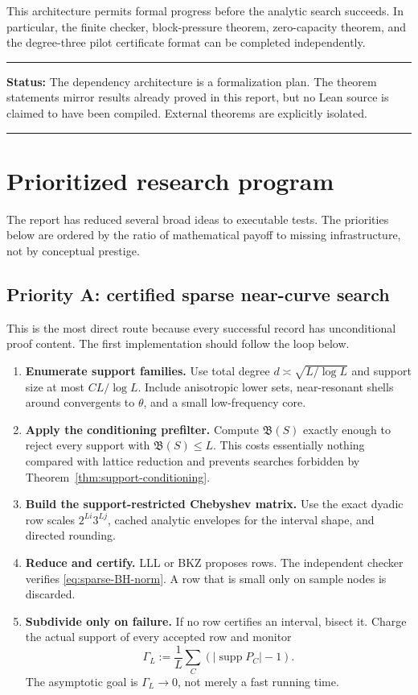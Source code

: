 \documentclass[11pt,oneside]{article}
\theoremstyle{definition}
\theoremstyle{remark}
\newcommand{\supp}{\operatorname{supp}}
\newcommand{\tht}{\theta}
\newenvironment{statusbox}[1]
{\begin{center}\begin{minipage}{0.95\textwidth}\raggedright\hrule
\vspace{0.45em}\textbf{Status:} #1\par\vspace{0.35em}}
{\vspace{0.35em}\hrule\end{minipage}\end{center}}
\begin{document}
This architecture permits formal progress before the analytic search succeeds.  In particular,
the finite checker, block-pressure theorem, zero-capacity theorem, and the degree-three pilot
certificate format can be completed independently.

\begin{statusbox}{The dependency architecture is a formalization plan.  The theorem statements
mirror results already proved in this report, but no Lean source is claimed to have been compiled.
External theorems are explicitly isolated.}
\end{statusbox}

\section{Prioritized research program}
\label{sec:program}

The report has reduced several broad ideas to executable tests.  The priorities below are ordered
by the ratio of mathematical payoff to missing infrastructure, not by conceptual prestige.

\subsection{Priority A: certified sparse near-curve search}

This is the most direct route because every successful record has unconditional proof content.
The first implementation should follow the loop below.

\begin{enumerate}
\item \textbf{Enumerate support families.}  Use total degree
$d\asymp\sqrt{L/\log L}$ and support size at most $CL/\log L$.  Include anisotropic lower sets,
near-resonant shells around convergents to $\tht$, and a small low-frequency core.
\item \textbf{Apply the conditioning prefilter.}  Compute $\mathfrak B(S)$ exactly enough to
reject every support with $\mathfrak B(S)\le L$.  This costs essentially nothing compared with
lattice reduction and prevents searches forbidden by Theorem~\ref{thm:support-conditioning}.
\item \textbf{Build the support-restricted Chebyshev matrix.}  Use the exact dyadic row scales
$2^{Li}3^{Lj}$, cached analytic envelopes for the interval shape, and directed rounding.
\item \textbf{Reduce and certify.}  LLL or BKZ proposes rows.  The independent checker verifies
\eqref{eq:sparse-BH-norm}.  A row that is small only on sample nodes is discarded.
\item \textbf{Subdivide only on failure.}  If no row certifies an interval, bisect it.  Charge the
actual support of every accepted row and monitor
\[
  \Gamma_L:=\frac1L\sum_C(|\supp P_C|-1).
\]
The asymptotic goal is $\Gamma_L\to0$, not merely a fast running time.
\end{enumerate}
\end{document}
